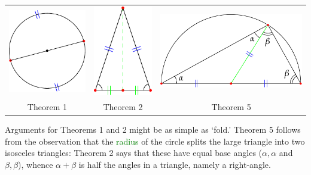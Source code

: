 \begin{center}
	\begin{tabular}{c@{\qquad\qquad}c@{\qquad\qquad}c}
		\includegraphics[scale=0.9]{thales-1}
		&
		\includegraphics[scale=0.9]{thales-2}
		&
		\includegraphics[scale=0.9]{thales-5}
		\\
		Theorem 1
		&
		Theorem 2
		&
		Theorem 5
	\end{tabular}
\end{center}
Arguments for Theorems 1 and 2 might be as simple as `fold.' Theorem 5 follows from the observation that the \textcolor{Green}{radius} of the circle splits the large triangle into two isosceles triangles: Theorem 2 says that these have equal base angles ($\alpha,\alpha$ and $\beta,\beta$), whence $\alpha+\beta$ is half the angles in a triangle, namely a right-angle.



